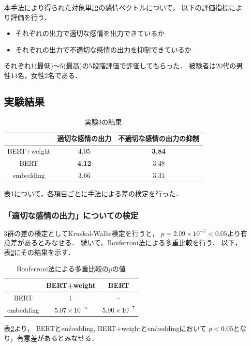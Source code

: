 	本手法により得られた対象単語の感情ベクトルについて，
	以下の評価指標により評価を行う．
	\begin{itemize}
		\item それぞれの出力で適切な感情を出力できているか
		\item それぞれの出力で不適切な感情の出力を抑制できているか
	\end{itemize}
	それぞれ1(最低)～5(最高)の5段階評価で評価してもらった．
	被験者は20代の男性14名，女性2名である．
	

	\subsection{実験結果}
	\begin{table}[H]
		\centering
		\caption{実験3の結果}
		\label{kansei_tagigo_result}
			\begin{tabular}{ccc}
				\hline
				& 適切な感情の出力 & 不適切な感情の出力の抑制 \\
				\hline \hline
				BERT+weight & 4.05 & \textbf{3.84} \\
				BERT & \textbf{4.12} & 3.48 \\
				embedding & 3.66 & 3.31 \\
				\hline
			\end{tabular}
	\end{table}

	表\ref{kansei_tagigo_result}について，各項目ごとに手法による差の検定を行った．
	\subsubsection{「適切な感情の出力」についての検定}
		3群の差の検定としてKruskal-Wallis検定を行うと，
		$p=2.09\times10^{-7}<0.05$より有意差があるとみなせる．
		続いて，Bonferroni法による多重比較を行う．
		以下，表\ref{table:jikken3_good_Bonferroni}にその結果を示す．
		\begin{table}[H]
			\centering
			\caption{Bonferroni法による多重比較の$p$の値}
			\label{table:jikken3_good_Bonferroni}
			\begin{tabular}{|c|c|c|}
				\hline
				& BERT+weight & BERT \\
				\hline
				BERT & 1 & - \\
				\hline
				embedding & $5.07\times10^{-5}$ & $5.90\times10^{-7}$ \\
				\hline
			\end{tabular}
		\end{table}
		表\ref{table:jikken3_good_Bonferroni}より，
		BERTとembedding, BERT+weightとembeddingにおいて
		$p<0.05$となり，有意差があるとみなせる．

